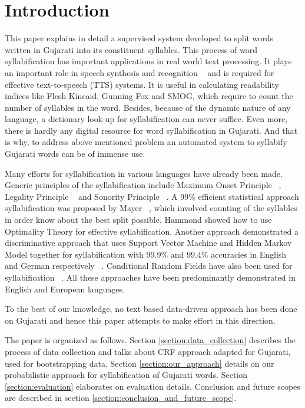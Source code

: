 \documentclass[runningheads,a4paper]{llncs}
\begin{document}
\section{Introduction}
\label{section:introduction}
This paper explains in detail a supervised system developed to split words written in Gujarati into its constituent syllables. This process of word syllabification has important applications in real world text processing. It plays an important role in speech synthesis and recognition ~\cite{kiraz1998multilingual} and is required for effective text-to-speech (TTS) systems. It is useful in calculating readability indices like Flesh Kincaid, Gunning Fox and SMOG, which require to count the number of syllables in the word. Besides, because of the dynamic nature of any language, a dictionary look-up for syllabification can never suffice. Even more, there is hardly any digital resource for word syllabification in Gujarati. And that is why, to address above mentioned problem an automated system to syllabify Gujarati words can be of immense use.

Many efforts for syllabification in various languages have already been made. Generic principles of the syllabification include Maximum Onset Principle ~\cite{kahn1976syllable}, Legality Principle ~\cite{goslin2001comparison} and Sonority Principle ~\cite{selkirk1984major}. A 99\% efficient statistical approach syllabification was proposed by Mayer ~\cite{mayer2010toward}, which involved counting of the syllables in order know about the best split possible. Hammond \cite{hammond1997parsing} showed how to use Optimality Theory for effective syllabification. Another approach demonstrated a discriminative approach that uses Support Vector Machine and Hidden Markov Model together for syllabification with 99.9\% and 99.4\% accuracies in English and German respectively ~\cite{bartlett2009syllabification}. Conditional Random Fields have also been used for syllabification ~\cite{crf_automatic_syllabification}. All these approaches have been predominantly demonstrated in English and European languages.

To the best of our knowledge, no text based data-driven approach has been done on Gujarati and hence this paper attempts to make effort in this direction.

The paper is organized as follows. Section \ref{section:data_collection} describes the process of data collection and talks about CRF approach adapted for Gujarati, used for bootstrapping data. Section \ref{section:our_approach} details on our probabilistic approach for syllabification of Gujarati words. Section \ref{section:evaluation} elaborates on evaluation details. Conclusion and future scopes are described in section \ref{section:conclusion_and_future_scope}.
\end{document}

